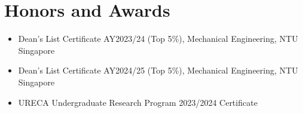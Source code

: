 \documentclass[a4paper,11pt]{article}
\begin{document}
\section{Honors and Awards}
\begin{itemize}[nosep,after=\strut, leftmargin=1em, itemsep=3pt,label=--]
\item Dean’s List Certificate AY2023/24 (Top 5\%), Mechanical Engineering, NTU Singapore
\item Dean’s List Certificate AY2024/25 (Top 5\%), Mechanical Engineering, NTU Singapore
\item URECA Undergraduate Research Program 2023/2024 Certificate
\end{itemize}

\vfill
{}
\end{document}
